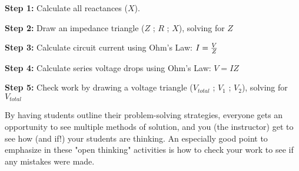 \vskip 10pt

\goodbreak

{\bf Step 1:} Calculate all reactances ($X$).

{\bf Step 2:} Draw an impedance triangle ($Z$ ; $R$ ; $X$), solving for $Z$

{\bf Step 3:} Calculate circuit current using Ohm's Law: $I = {V \over Z}$

{\bf Step 4:} Calculate series voltage drops using Ohm's Law: $V = {I Z}$

{\bf Step 5:} Check work by drawing a voltage triangle ($V_{total}$ ; $V_1$ ; $V_2$), solving for $V_{total}$

\vskip 10pt

By having students outline their problem-solving strategies, everyone gets an opportunity to see multiple methods of solution, and you (the instructor) get to see how (and if!) your students are thinking.  An especially good point to emphasize in these "open thinking" activities is how to check your work to see if any mistakes were made.




